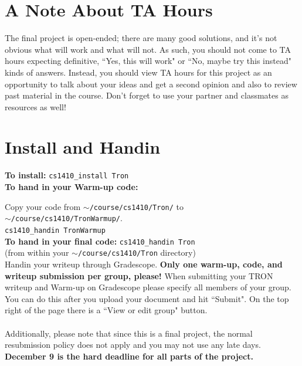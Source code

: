 \documentclass{article}
\begin{document}
\section{A Note About TA Hours}

The final project is open-ended; there are many good solutions, and it's not obvious what will work and what will not.
As such, you should not come to TA hours expecting definitive, ``Yes, this will work" or ``No, maybe try this instead" kinds of answers.
Instead, you should view TA hours for this project as an opportunity to talk about your ideas and get a second opinion and also to review past material in the course.
Don't forget to use your partner and classmates as resources as well!

\section{Install and Handin}

\textbf{To install:} \verb|cs1410_install Tron| ~\\

\textbf{To hand in your Warm-up code:} 
 \item Copy your code from \texttt{$\sim$/course/cs1410/Tron/} to \\ \texttt{$\sim$/course/cs1410/TronWarmup/}.\\

\verb|cs1410_handin TronWarmup| ~\\

\textbf{To hand in your final code:} \verb|cs1410_handin Tron| ~\\ (from within your  \texttt{$\sim$/course/cs1410/Tron} directory) \\


Handin your writeup through Gradescope.
\textbf{Only one warm-up, code, and writeup submission per group, please!} When submitting your TRON writeup and Warm-up on Gradescope please specify all members of your group. You can do this after you upload your document and hit ``Submit". On the top right of the page there is a ``View or edit group" button.
\\ \\
Additionally, please note that since this is a final project, the normal resubmission policy does not apply and you may not use any late days. \textbf{December 9 is the hard deadline for all parts of the project.}
\end{document}
